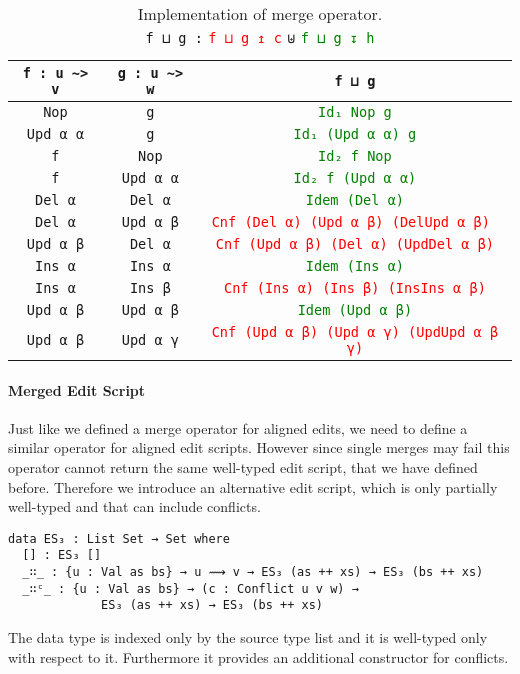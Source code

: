\documentclass[preprint]{sigplanconf}
\begin{document}
	\begin{table*}[t]
	\centering
	\begin{tabular}{| c | c | c |}
	\hline
	\texttt{f : u \textasciitilde> v} & \texttt{g : u \textasciitilde> w} &  \texttt{f ⊔ g} 
	\\ \hline
	\texttt{Nop} & \texttt{g} & \textcolor{Green}{\texttt{Id₁ Nop g}} 
	\\ \hline
	\texttt{Upd α α} & \texttt{g} & \textcolor{Green}{\texttt{Id₁ (Upd α α) g}} 
	\\ \hline
	\texttt{f} & \texttt{Nop} & \textcolor{Green}{\texttt{Id₂ f Nop}} 
	\\ \hline
	\texttt{f} & \texttt{Upd α α} & \textcolor{Green}{\texttt{Id₂ f (Upd α α)}} 
	\\ \hline
	\texttt{Del α} & \texttt{Del α} & \textcolor{Green}{\texttt{Idem (Del α)}}
	\\ \hline
	\texttt{Del α} & \texttt{Upd α β} & \textcolor{Red}{\texttt{Cnf (Del α) (Upd α β) (DelUpd α β) }}
	\\ \hline
	\texttt{Upd α β} & \texttt{Del α} & \textcolor{Red}{\texttt{Cnf (Upd α β) (Del α) (UpdDel α β)}}
	\\ \hline
	\texttt{Ins α} & \texttt{Ins α} & \textcolor{Green}{\texttt{Idem (Ins α)}} 
	\\	\hline
	\texttt{Ins α} & \texttt{Ins β} & \textcolor{Red}{\texttt{Cnf (Ins α) (Ins β) (InsIns α β)}}
	\\	\hline
	\texttt{Upd α β} & \texttt{Upd α β} & \textcolor{Green}{\texttt{Idem (Upd α β)}}
	\\	\hline
	\texttt{Upd α β} & \texttt{Upd α γ} & \textcolor{Red}{\texttt{Cnf (Upd α β) (Upd α γ) (UpdUpd α β γ)}}
	\\ \hline
	\end{tabular}
	
	\captionsetup{singlelinecheck=false, justification=centering}

	\caption{Implementation of merge operator. \\
	 \texttt{f ⊔ g :} \textcolor{Red}{\texttt{f ⊔ g ↥ c}} \texttt{⊎} \textcolor{Green}{\texttt{f ⊔ g ↧ h}}}	 
	\label{table:merge}
	\end{table*}

	\paragraph{Merged Edit Script}
	Just like we defined a merge operator for aligned edits, we need to 
	define a similar operator for aligned edit scripts.
	However since single merges may fail this operator cannot return 
	the same well-typed edit script, that we have defined before.
	Therefore we introduce an alternative edit script, which is only partially 
	well-typed and that can include conflicts.
\begin{verbatim}
data ES₃ : List Set → Set where
  [] : ES₃ []
  _∷_ : {u : Val as bs} → u ⟿ v → ES₃ (as ++ xs) → ES₃ (bs ++ xs)
  _∷ᶜ_ : {u : Val as bs} → (c : Conflict u v w) → 
             ES₃ (as ++ xs) → ES₃ (bs ++ xs)
\end{verbatim}
	The data type is indexed only by the source type list and it is well-typed
	only with respect to it. Furthermore it provides an additional constructor
	for conflicts. 
\end{document}
